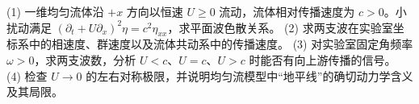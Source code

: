 (1) 一维均匀流体沿 \(+x\) 方向以恒速 \(U\ge0\) 流动，流体相对传播速度为 \(c>0\)。小扰动满足 \((\partial_t+U\partial_x)^2\eta=c^2\eta_{xx}\)，求平面波色散关系。
(2) 求两支波在实验室坐标系中的相速度、群速度以及流体共动系中的传播速度。
(3) 对实验室固定角频率 \(\omega>0\)，求两支波数，分析 \(U<c\)、\(U=c\)、\(U>c\) 时能否有向上游传播的信号。
(4) 检查 \(U\to0\) 的左右对称极限，并说明均匀流模型中“地平线”的确切动力学含义及其局限。
